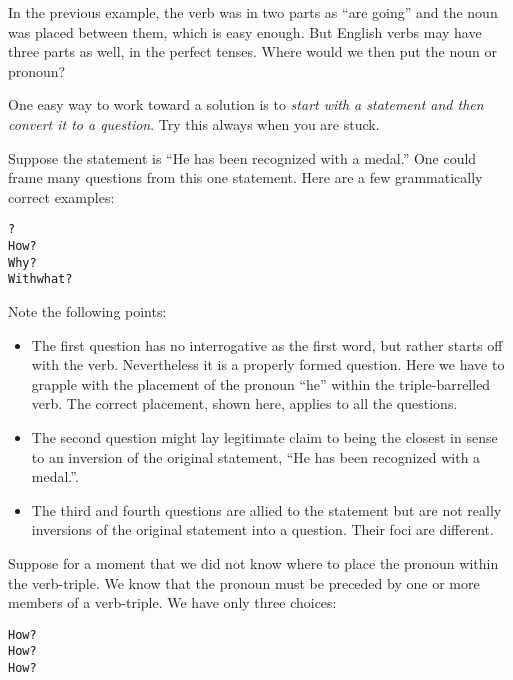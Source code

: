 \documentclass[
  11pt,
  british,
  a4paper,
]{article}
\begin{document}
In the previous example, the verb was in two parts as ``are going'' and
the noun was placed between them, which is easy enough. But English
verbs may have three parts as well, in the perfect tenses. Where would
we then put the noun or pronoun?

One easy way to work toward a solution is to \emph{start with a
statement and then convert it to a question}. Try this always when you
are stuck.

Suppose the statement is ``He has been recognized with a medal.'' One
could frame many questions from this one statement. Here are a few
grammatically correct examples:

\begin{tcolorbox}
\begin{alltt}
\color{normal}
  ?
How   ?
Why   ?
With what   ?
\end{alltt}
\end{tcolorbox}

Note the following points:

\begin{itemize}
\item
  The first question has no interrogative as the first word, but rather
  starts off with the verb. Nevertheless it is a properly formed
  question. Here we have to grapple with the placement of the pronoun
  ``he'' within the triple-barrelled verb. The correct placement, shown
  here, applies to all the questions.
\item
  The second question might lay legitimate claim to being the closest in
  sense to an inversion of the original statement, ``He has been
  recognized with a medal.''.
\item
  The third and fourth questions are allied to the statement but are not
  really inversions of the original statement into a question. Their
  foci are different.
\end{itemize}

Suppose for a moment that we did not know where to place the pronoun
within the verb-triple. We know that the pronoun must be preceded by one
or more members of a verb-triple. We have only three choices:

\begin{tcolorbox}
\begin{alltt}
\color{normal}
How   ?
How   ?
How  ?
\end{alltt}
\end{tcolorbox}
\end{document}
